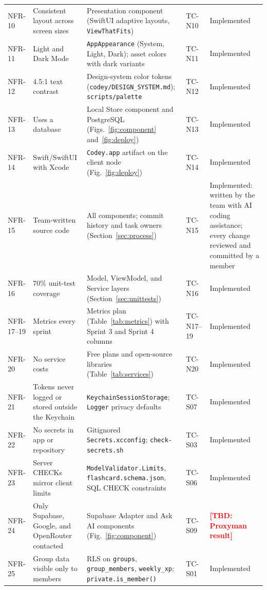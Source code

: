 \documentclass[12pt,letterpaper]{article}
\newcommand{\tbd}[1]{\textcolor{red}{\textbf{[TBD: #1]}}}
\begin{document}
\begin{xltabular}{\textwidth}{@{}l L{3.2cm} Y l L{2.6cm}@{}}
NFR-10 & Consistent layout across screen sizes & Presentation component (SwiftUI adaptive layouts, \texttt{ViewThatFits}) & TC-N10 & Implemented \\
NFR-11 & Light and Dark Mode & \texttt{AppAppearance} (System, Light, Dark); asset colors with dark variants & TC-N11 & Implemented \\
NFR-12 & 4.5:1 text contrast & Design-system color tokens (\texttt{codey/DESIGN\_SYSTEM.md}); \texttt{scripts/palette} & TC-N12 & Implemented \\
NFR-13 & Uses a database & Local Store component and PostgreSQL (Figs.~\ref{fig:component} and~\ref{fig:deploy}) & TC-N13 & Implemented \\
NFR-14 & Swift/SwiftUI with Xcode & \texttt{Codey.app} artifact on the client node (Fig.~\ref{fig:deploy}) & TC-N14 & Implemented \\
NFR-15 & Team-written source code & All components; commit history and task owners (Section~\ref{sec:process}) & TC-N15 & Implemented: written by the team with AI coding assistance; every change reviewed and committed by a member \\
NFR-16 & 70\% unit-test coverage & Model, ViewModel, and Service layers (Section~\ref{sec:unittests}) & TC-N16 & Implemented \\
NFR-17--19 & Metrics every sprint & Metrics plan (Table~\ref{tab:metrics}) with Sprint 3 and Sprint 4 columns & TC-N17--19 & Implemented \\
NFR-20 & No service costs & Free plans and open-source libraries (Table~\ref{tab:services}) & TC-N20 & Implemented \\
NFR-21 & Tokens never logged or stored outside the Keychain & \texttt{KeychainSessionStorage}; \texttt{Logger} privacy defaults & TC-S07 & Implemented \\
NFR-22 & No secrets in app or repository & Gitignored \texttt{Secrets.xcconfig}; \texttt{check-secrets.sh} & TC-S03 & Implemented \\
NFR-23 & Server CHECKs mirror client limits & \texttt{ModelValidator.Limits}, \texttt{flashcard.schema.json}, SQL CHECK constraints & TC-S06 & Implemented \\
NFR-24 & Only Supabase, Google, and OpenRouter contacted & Supabase Adapter and Ask AI components (Fig.~\ref{fig:component}) & TC-S09 & \tbd{Proxyman result} \\
NFR-25 & Group data visible only to members & RLS on \texttt{groups}, \texttt{group\_members}, \texttt{weekly\_xp}; \texttt{private.is\_member()} & TC-S01 & Implemented \\

\end{xltabular}
\end{document}
